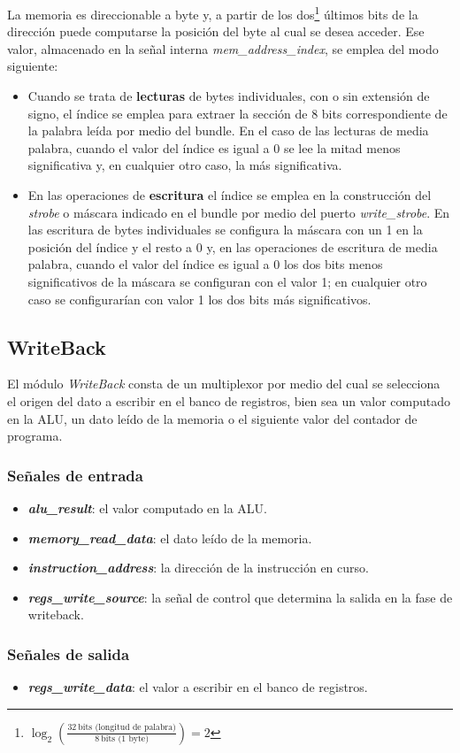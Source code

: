 La memoria es direccionable a byte y, a partir de los dos\footnote{$\log_2\left(\frac{32\ \text{bits (longitud de palabra)}}{8\ \text{bits (1 byte)}}\right) = 2$} últimos bits de la dirección puede computarse la posición del byte al cual se desea acceder. Ese valor, almacenado en la señal interna \textit{mem\_address\_index}, se emplea del modo siguiente:

\begin{itemize}
  \item Cuando se trata de \textbf{lecturas} de bytes individuales, con o sin extensión de signo, el índice se emplea para extraer la sección de 8 bits correspondiente de la palabra leída por medio del bundle. En el caso de las lecturas de media palabra, cuando el valor del índice es igual a 0 se lee la mitad menos significativa y, en cualquier otro caso, la más significativa.
  \item En las operaciones de \textbf{escritura} el índice se emplea en la construcción del \textit{strobe} o máscara indicado en el bundle por medio del puerto \textit{write\_strobe}. En las escritura de bytes individuales se configura la máscara con un 1 en la posición del índice y el resto a 0 y, en las operaciones de escritura de media palabra, cuando el valor del índice es igual a 0 los dos bits menos significativos de la máscara se configuran con el valor 1; en cualquier otro caso se configurarían con valor 1 los dos bits más significativos.
\end{itemize}

\subsection{WriteBack}

El módulo \textit{WriteBack} consta de un multiplexor por medio del cual se selecciona el origen del dato a escribir en el banco de registros, bien sea un valor computado en la ALU, un dato leído de la memoria o el siguiente valor del contador de programa.

\subsubsection{Señales de entrada}

\begin{itemize}
  \item \textbf{\textit{alu\_result}}: el valor computado en la ALU.
  \item \textbf{\textit{memory\_read\_data}}: el dato leído de la memoria.
  \item \textbf{\textit{instruction\_address}}: la dirección de la instrucción en curso.
  \item \textbf{\textit{regs\_write\_source}}: la señal de control que determina la salida en la fase de writeback.
\end{itemize}

\subsubsection{Señales de salida}

\begin{itemize}
  \item \textbf{\textit{regs\_write\_data}}: el valor a escribir en el banco de registros.
\end{itemize}